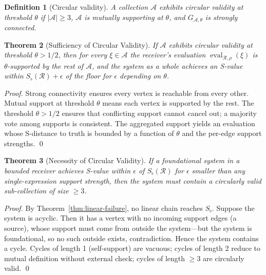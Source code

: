 \documentclass[twocolumn,a4paper]{article}
\newtheorem{theorem}{Theorem}[section]
\newtheorem{definition}[theorem]{Definition}
\DeclareMathOperator{\eval}{eval}
\newcommand{\receiver}{\mathcal{R}}
\newcommand{\Sfloor}{S_{\flat}}
\begin{document}
\begin{definition}[Circular validity]
\label{def:circular-validity}
A collection $\mathcal{A}$ exhibits \emph{circular validity at threshold $\theta$} if $|\mathcal{A}|\geq 3$, $\mathcal{A}$ is mutually supporting at $\theta$, and $G_{\mathcal{A},\theta}$ is strongly connected.
\end{definition}

\begin{theorem}[Sufficiency of Circular Validity]
\label{thm:circular-sufficiency}
If $\mathcal{A}$ exhibits circular validity at threshold $\theta>1/2$, then for every $\xi\in\mathcal{A}$ the receiver's evaluation $\eval_{\receiver,\rho}(\xi)$ is $\theta$-supported by the rest of $\mathcal{A}$, and the system as a whole achieves an S-value within $\Sfloor(\receiver)+\epsilon$ of the floor for $\epsilon$ depending on $\theta$.
\end{theorem}

\begin{proof}
Strong connectivity ensures every vertex is reachable from every other. Mutual support at threshold $\theta$ means each vertex is supported by the rest. The threshold $\theta>1/2$ ensures that conflicting support cannot cancel out; a majority vote among supports is consistent. The aggregated support yields an evaluation whose S-distance to truth is bounded by a function of $\theta$ and the per-edge support strengths. \qed
\end{proof}

\begin{theorem}[Necessity of Circular Validity]
\label{thm:circular-necessity}
If a foundational system in a bounded receiver achieves S-value within $\epsilon$ of $\Sfloor(\receiver)$ for $\epsilon$ smaller than any single-expression support strength, then the system must contain a circularly valid sub-collection of size $\geq 3$.
\end{theorem}

\begin{proof}
By Theorem~\ref{thm:linear-failure}, no linear chain reaches $\Sfloor$. Suppose the system is acyclic. Then it has a vertex with no incoming support edges (a source), whose support must come from outside the system---but the system is foundational, so no such outside exists, contradiction. Hence the system contains a cycle. Cycles of length 1 (self-support) are vacuous; cycles of length 2 reduce to mutual definition without external check; cycles of length $\geq 3$ are circularly valid. \qed
\end{proof}
\end{document}
